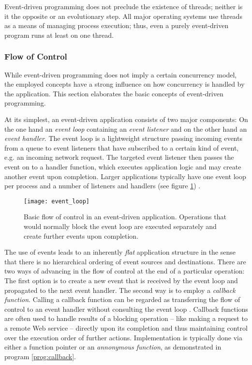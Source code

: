 Event-driven programming does not preclude the existence of threads; neither is it the opposite or an evolutionary step. All major operating systems use threads as a means of managing process execution; thus, even a purely event-driven program runs at least on one thread.

\subsubsection*{Flow of Control}
\label{lab:flow}
While event-driven programming does not imply a certain concurrency model, the employed concepts have a strong influence on how concurrency is handled by the application. This section elaborates the basic concepts of event-driven programming.

At its simplest, an event-driven application consists of two major components: On the one hand an \textit{event loop} containing an \textit{event listener} and on the other hand an \textit{event handler}. The event loop is a lightweight structure passing incoming events from a queue to event listeners that have subscribed to a certain kind of event, e.g. an incoming network request. The targeted event listener then passes the event on to a handler function, which executes application logic and may create another event upon completion. Larger applications typically have one event loop per process and a number of listeners and handlers (see figure \ref{fig:event_loop}) \cite[p. 33]{Hughes-Croucher2012}.

\begin{figure}
\centering\small
\setlength{\tabcolsep}{0mm}
  \texttt{[image: event\_loop]}
\caption{
Basic flow of control in an event-driven application. Operations that would normally block the event loop are executed separately and create further events upon completion.
}
\label{fig:event_loop}
\end{figure}

The use of events leads to an inherently \textit{flat} application structure in the sense that there is no hierarchical ordering of event sources and destinations. There are two ways of advancing in the flow of control at the end of a particular operation: The first option is to create a new event that is received by the event loop and propagated to the next event handler. The second way is to employ a \textit{callback function}. Calling a callback function can be regarded as transferring the flow of control to an event handler without consulting the event loop \cite[p. 92]{Erb2012}. Callback functions are often used to handle results of a blocking operation -- like making a request to a remote Web service -- directly upon its completion and thus maintaining control over the execution order of further actions. Implementation is typically done via either a function pointer or an \textit{annonymous function}, as demonstrated in program \ref{prog:callback}.

